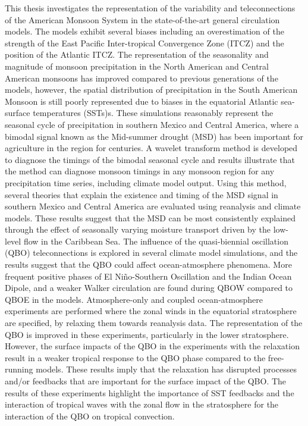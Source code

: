 This thesis investigates the representation of the variability and teleconnections of the American Monsoon System in the state-of-the-art general circulation models. 
The models exhibit several biases including an overestimation of the strength of the East Pacific Inter-tropical Convergence Zone (ITCZ) and the position of the Atlantic ITCZ.
The representation of the seasonality and magnitude of monsoon precipitation in the North American and Central American monsoons has improved compared to previous generations of the models, however, the spatial distribution of precipitation in the South American Monsoon is still poorly represented due to biases in the equatorial Atlantic sea-surface temperatures (SSTs)s.
\vspace{1mm}
These simulations reasonably represent the seasonal cycle of precipitation in southern Mexico and Central America, where a bimodal signal known as the Mid-summer drought (MSD) has been important for agriculture in the region for centuries. 
A wavelet transform method is developed to diagnose the timings of the bimodal seasonal cycle and results illustrate that the method can diagnose monsoon timings in any monsoon region for any precipitation time series, including climate model output.
Using this method, several theories that explain the existence and timing of the MSD signal in southern Mexico and Central America are evaluated using reanalysis and climate models.
These results suggest that the MSD can be most consistently explained through the effect of seasonally varying moisture transport driven by the low-level flow in the Caribbean Sea.
\vspace{1mm}
The influence of the quasi-biennial oscillation (QBO) teleconnections is explored in several climate model simulations, and the results suggest that the QBO could affect ocean-atmosphere phenomena. 
More frequent positive phases of El Niño-Southern Oscillation and the Indian Ocean Dipole, and a weaker Walker circulation are found during QBOW compared to QBOE in the models. 
\vspace{1mm}
Atmosphere-only and coupled ocean-atmosphere experiments are performed where the zonal winds in the equatorial stratosphere are specified, by relaxing them towards reanalysis data. 
The representation of the QBO is improved in these experiments, particularly in the lower stratosphere. However, the surface impacts of the QBO in the experiments with the relaxation result in a weaker tropical response to the QBO phase compared to the free-running models. These results imply that the relaxation has disrupted processes and/or feedbacks that are important for the surface impact of the QBO. 
The results of these experiments highlight the importance of SST feedbacks and the interaction of tropical waves with the zonal flow in the stratosphere for the interaction of the QBO on tropical convection.